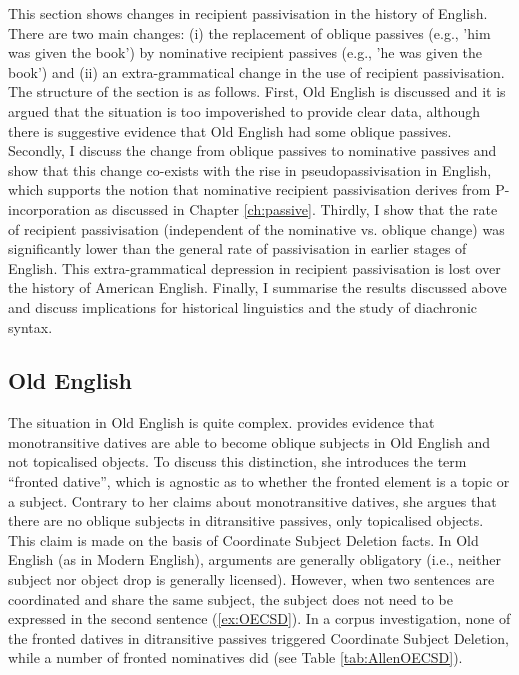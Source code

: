 	This section shows changes in recipient passivisation in the history of English. There are two main changes: (i) the replacement of oblique passives (e.g., 'him was given the book') by nominative recipient passives (e.g., 'he was given the book') and (ii) an extra-grammatical change in the use of recipient passivisation. The structure of the section is as follows. First, Old English is discussed and it is argued that the situation is too impoverished to provide clear data, although there is suggestive evidence that Old English had some oblique passives. Secondly, I discuss the change from oblique passives to nominative passives and show that this change co-exists with the rise in pseudopassivisation in English, which supports the notion that nominative recipient passivisation derives from P-incorporation as discussed in Chapter \ref{ch:passive}. Thirdly, I show that the rate of recipient passivisation (independent of the nominative vs. oblique change) was significantly lower than the general rate of passivisation in earlier stages of English. This extra-grammatical depression in recipient passivisation is lost over the history of American English. Finally, I summarise the results discussed above and discuss implications for historical linguistics and the study of diachronic syntax.

\subsection{Old English}
	The situation in Old English is quite complex. \cite{Allen.1999} provides evidence that monotransitive datives are able to become oblique subjects in Old English and not topicalised objects. To discuss this distinction, she introduces the term ``fronted dative'', which is agnostic as to whether the fronted element is a topic or a subject. Contrary to her claims about monotransitive datives, she argues that there are no oblique subjects in ditransitive passives, only topicalised objects. This claim is made on the basis of Coordinate Subject Deletion facts. In Old English (as in Modern English), arguments are generally obligatory (i.e., neither subject nor object drop is generally licensed). However, when two sentences are coordinated and share the same subject, the subject does not need to be expressed in the second sentence (\ref{ex:OECSD}). In a corpus investigation, none of the fronted datives in ditransitive passives triggered Coordinate Subject Deletion, while a number of fronted nominatives did (see Table \ref{tab:AllenOECSD}). 

